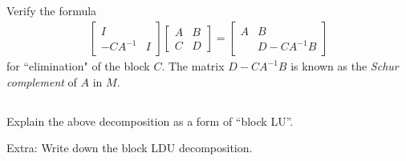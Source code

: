 \documentclass[11pt,letterpaper]{article}
\begin{document}
\subsection{}
Verify the formula
\begin{align*}
     \begin{bmatrix}
    I & \\
    -CA^{-1} & I
    \end{bmatrix} \begin{bmatrix}
    A &B\\
    C &D
    \end{bmatrix} =  \begin{bmatrix}
    A &B\\
     &D-CA^{-1}B
    \end{bmatrix}
\end{align*}
for ``elimination" of the block $C$. The matrix $D-CA^{-1}B$ is  known as the \textit{Schur complement} of $A$ in $M$.

\subsection{}
Explain the above decomposition as a form of ``block LU''. 

Extra: Write down the block LDU decomposition. 
    
    
\printbibliography
\end{document}
